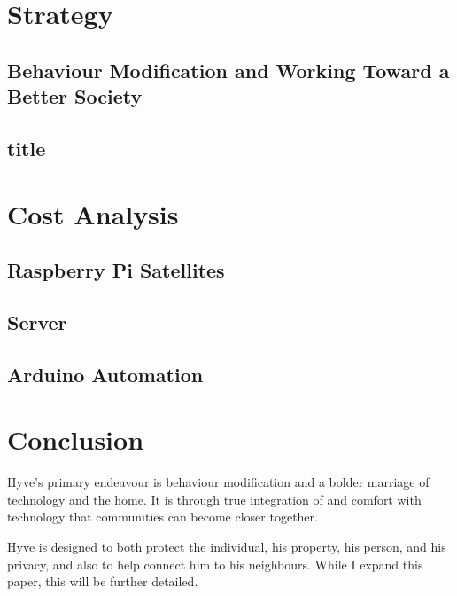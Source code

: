 			\begin{multicols}{2}
		
		
			
\section{Strategy}

	\subsection{Behaviour Modification and Working Toward a Better Society}
			
	\subsection{title}
			
\section{Cost Analysis}

	\subsection{Raspberry Pi Satellites}
	
	\subsection{Server}
	
	\subsection{Arduino Automation}
		
\section{Conclusion}

	Hyve's primary endeavour is behaviour modification and a bolder marriage of technology and the home.
	It is through true integration of and comfort with technology that communities can become closer together.
	
	Hyve is designed to both protect the individual, his property, his person, and his privacy, and also to help connect him to his neighbours.
	While I expand this paper, this will be further detailed.

\end{multicols}
